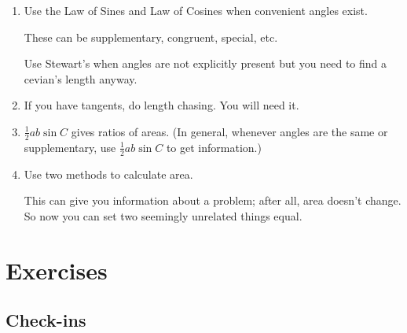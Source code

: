 \begin{enumerate}
    \item Use the Law of Sines and Law of Cosines when convenient angles exist.
    
    \begin{itemize}
    
    \Item These can be supplementary, congruent, special, etc.
    
    \Item Use Stewart's when angles are not explicitly present but you need to find a cevian's length anyway.
    
    \end{itemize}
    
    \item If you have tangents, do length chasing. You will need it.
    
    \item $\frac{1}{2}ab\sin C$ gives ratios of areas. (In general, whenever angles are the same or supplementary, use $\frac{1}{2}ab\sin C$ to get information.)
    
    \item Use two methods to calculate area.
    
    \begin{itemize}
    
    \Item This can give you information about a problem; after all, area doesn't change. So now you can set two seemingly unrelated things equal.
    
    \end{itemize}
\end{enumerate}

\pagebreak

\section{Exercises}

\subsection{Check-ins}

